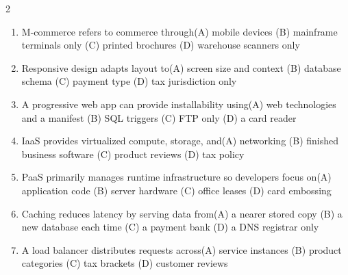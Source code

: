 \documentclass[a4paper]{article}
\begin{document}
\begin{multicols*}{2}
\begin{enumerate}[resume]
\item M-commerce refers to commerce through\newline\hspace*{0.6em}(A) mobile devices \quad (B) mainframe terminals only \newline\hspace*{0.6em}(C) printed brochures \quad (D) warehouse scanners only
\item Responsive design adapts layout to\newline\hspace*{0.6em}(A) screen size and context \quad (B) database schema \newline\hspace*{0.6em}(C) payment type \quad (D) tax jurisdiction only
\item A progressive web app can provide installability using\newline\hspace*{0.6em}(A) web technologies and a manifest \quad (B) SQL triggers \newline\hspace*{0.6em}(C) FTP only \quad (D) a card reader
\item IaaS provides virtualized compute, storage, and\newline\hspace*{0.6em}(A) networking \quad (B) finished business software \newline\hspace*{0.6em}(C) product reviews \quad (D) tax policy
\item PaaS primarily manages runtime infrastructure so developers focus on\newline\hspace*{0.6em}(A) application code \quad (B) server hardware \newline\hspace*{0.6em}(C) office leases \quad (D) card embossing
\item Caching reduces latency by serving data from\newline\hspace*{0.6em}(A) a nearer stored copy \quad (B) a new database each time \newline\hspace*{0.6em}(C) a payment bank \quad (D) a DNS registrar only
\item A load balancer distributes requests across\newline\hspace*{0.6em}(A) service instances \quad (B) product categories \newline\hspace*{0.6em}(C) tax brackets \quad (D) customer reviews

\end{enumerate}
\end{multicols*}
\end{document}
